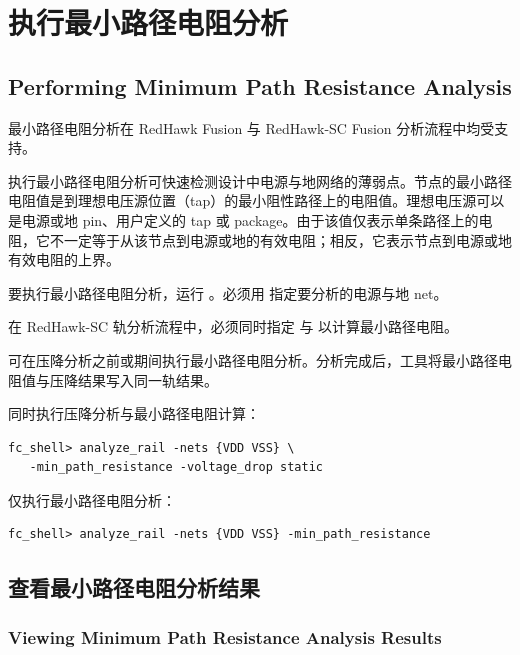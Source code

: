 \section{执行最小路径电阻分析}
\subsection*{Performing Minimum Path Resistance Analysis}

\begin{noteBox}
最小路径电阻分析在 RedHawk Fusion 与 RedHawk-SC Fusion 分析流程中均受支持。
\end{noteBox}

执行最小路径电阻分析可快速检测设计中电源与地网络的薄弱点。节点的最小路径电阻值是到理想电压源位置（tap）的最小阻性路径上的电阻值。理想电压源可以是电源或地 pin、用户定义的 tap 或 package。由于该值仅表示单条路径上的电阻，它不一定等于从该节点到电源或地的有效电阻；相反，它表示节点到电源或地有效电阻的上界。

要执行最小路径电阻分析，运行  。必须用  指定要分析的电源与地 net。

\begin{noteBox}
在 RedHawk-SC 轨分析流程中，必须同时指定  与  以计算最小路径电阻。
\end{noteBox}

可在压降分析之前或期间执行最小路径电阻分析。分析完成后，工具将最小路径电阻值与压降结果写入同一轨结果。

同时执行压降分析与最小路径电阻计算：
\begin{lstlisting}
fc_shell> analyze_rail -nets {VDD VSS} \
   -min_path_resistance -voltage_drop static
\end{lstlisting}

仅执行最小路径电阻分析：
\begin{lstlisting}
fc_shell> analyze_rail -nets {VDD VSS} -min_path_resistance
\end{lstlisting}

\subsection{查看最小路径电阻分析结果}
\subsubsection*{Viewing Minimum Path Resistance Analysis Results}

